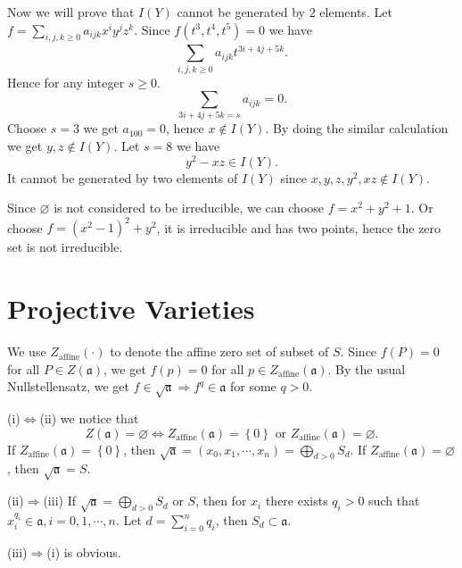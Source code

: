 Now we will prove that $I(Y)$ cannot be generated by $2$ elements. Let $f=\sum_{i,j,k\ge 0}^{} a_{ijk}x^{i}y^{j}z^{k}$. Since $f(t^3,t ^{4},t ^{5})=0$ we have
\[
  \sum_{i,j,k\ge 0}^{} a_{ijk}t ^{3i+4j+5k}.
\]
Hence for any integer $s\ge 0$. 
\[
\sum_{3i+4j+5k=s} a_{ijk}=0.
\]
Choose $s=3$ we get $a_{100}=0$, hence $x\not\in  I(Y)$. By doing the similar calculation we get $y,z\notin I(Y)$. Let  $s=8$ we have 
\[
  y^2-xz \in I(Y).
\]
It cannot be generated by two elements of $I(Y)$ since  $x,y,z,y^2,xz\notin I(Y)$.
\begin{solution}
  Since $\varnothing$ is not considered to be irreducible, we can choose $f=x^2+y^2+1$. Or choose $f=(x^2-1)^2+y^2$, it is irreducible and has two points, hence the zero set is not irreducible.
\end{solution}
\section{Projective Varieties}

\begin{solution}
  We use $Z_{\mathrm{affine}}(\cdot )$ to denote the affine zero set of subset of $S$. Since $f(P)=0$ for all $P\in Z(\mathfrak{a})$, we get $f(p)=0$ for all $p\in Z_{\mathrm{affine}}(\mathfrak{a})$. By the usual Nullstellensatz, we get $f\in \sqrt{\mathfrak{a}}\Rightarrow f^{q}\in \mathfrak{a}$ for some $q>0$.
\end{solution}

\begin{solution}
  (i)$\Leftrightarrow$(ii) we notice that 
  \[
    Z(\mathfrak{a})=\varnothing \Longleftrightarrow Z_{\mathrm{affine}}(\mathfrak{a})=\left\{0\right\}  \text{ or }Z_{\mathrm{affine}}(\mathfrak{a})=\varnothing.
  \]
  If $Z_{\mathrm{affine}}(\mathfrak{a})=\left\{0\right\} $, then $\sqrt{\mathfrak{a}} =(x_0,x_1,\cdots,x_n)=\bigoplus_{d>0}S_d$. If $Z_{\mathrm{affine}}(\mathfrak{a})=\varnothing$, then $\sqrt{\mathfrak{a}}=S$.

  (ii)$\Rightarrow$(iii) If $\sqrt{\mathfrak{a}} =\bigoplus_{d>0}S_d$ or $S$, then for $x_i$ there exists $q_i>0$ such that $x_i^{q_i}\in \mathfrak{a},i=0,1,\cdots,n$. Let $d=\sum_{i=0}^{n} q_i$, then $S_d \subset \mathfrak{a}$. 
 
  (iii)$\Rightarrow$(i) is obvious.
\end{solution}

